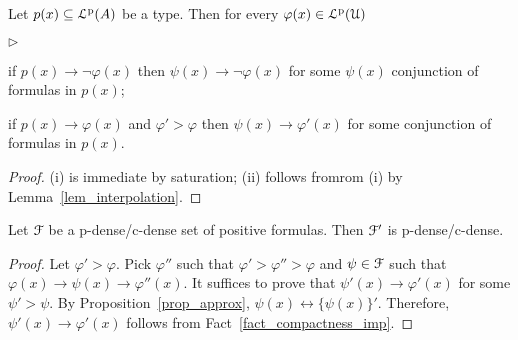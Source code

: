 \documentclass[10pt,oneside]{amsproc}
\newcommand{\mylabel}[1]{{#1}\hfill}
\renewenvironment{itemize}
  {\begin{list}{$\triangleright$}{%
  \setlength{\parskip}{0mm}
  \setlength{\topsep}{.4\baselineskip}
  \setlength{\rightmargin}{0mm}
  \setlength{\listparindent}{0mm}
  \setlength{\itemindent}{0mm}
  \setlength{\labelwidth}{3ex}
  \setlength{\itemsep}{.2\baselineskip}
  \setlength{\parsep}{.2\baselineskip}
  \setlength{\partopsep}{0mm}
  \setlength{\labelsep}{1ex}
  \setlength{\leftmargin}{\labelwidth+\labelsep}
  \let\makelabel\mylabel}}{%
\end{list}}
\def\existsH{\exists}
\begin{document}
{\begin{fact}\label{fact_compactness_imp}
  Let $p(x)\subseteq{\EuScript L}^{\rm p}(A)$ be a type.
  Then for every  $\varphi(x)\in{\EuScript L}^{\rm p}({\EuScript U})$
  \begin{itemize}
    \item[i.] if $p(x)\rightarrow\neg\varphi(x)$ then $\psi(x)\rightarrow\neg\varphi(x)$ for some $\psi(x)$ conjunction of formulas in $p(x)$;
    \item[ii.] if $p(x)\rightarrow\varphi(x)$ and $\varphi'>\varphi$ then $\psi(x)\rightarrow\varphi'(x)$ for some conjunction of formulas in $p(x)$.
  \end{itemize} 
\end{fact}

\begin{proof}
  (i) is immediate by saturation; (ii) follows fromrom (i) by Lemma~\ref{lem_interpolation}.
\end{proof}

\begin{fact}\label{fact_Fdense}
  Let ${\EuScript F}$ be a p-dense/c-dense set of positive formulas.
  Then ${\EuScript F}'$ is p-dense/c-dense.
\end{fact}

\begin{proof}
  Let $\varphi'>\varphi$.
  Pick $\varphi''$ such that $\varphi'>\varphi''>\varphi$ and $\psi\in{\EuScript F}$ such that $\varphi(x)\rightarrow\psi(x)\rightarrow\varphi''(x)$.
  It suffices to prove that $\psi'(x)\rightarrow\varphi'(x)$ for some $\psi'>\psi$.
  By Proposition~\ref{prop_approx}, $\psi(x)\leftrightarrow\{\psi(x)\}'$.
  Therefore, $\psi'(x)\rightarrow\varphi'(x)$ follows from Fact~\ref{fact_compactness_imp}.
\end{proof}

  



}
\end{document}
